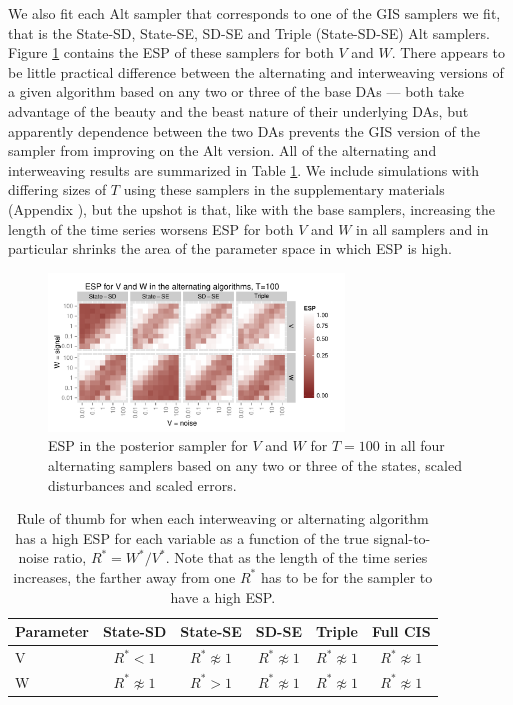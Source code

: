 \documentclass[12pt]{article}
\begin{document}
We also fit each Alt sampler that corresponds to one of the GIS samplers we fit, that is the State-SD, State-SE, SD-SE and Triple (State-SD-SE) Alt samplers. Figure \ref{altESplot} contains the ESP of these samplers for both $V$ and $W$. There appears to be little practical difference between the alternating and interweaving versions of a given algorithm based on any two or three of the base DAs --- both take advantage of the beauty and the beast nature of their underlying DAs, but apparently dependence between the two DAs prevents the GIS version of the sampler from improving on the Alt version. All of the alternating and interweaving results are summarized in Table \ref{tab:stnmix2}. We include simulations with differing sizes of $T$ using these samplers in the supplementary materials (Appendix ), but the upshot is that, like with the base samplers, increasing the length of the time series worsens ESP for both $V$ and $W$ in all samplers and in particular shrinks the area of the parameter space in which ESP is high.

\begin{figure}[!h]
\centering
\includegraphics[width=0.7\textwidth]{altESplot100}
\caption{ESP in the posterior sampler for $V$ and $W$ for $T=100$ in all four alternating samplers based on any two or three of the states, scaled disturbances and scaled errors.}
\label{altESplot}
\end{figure}

\begin{table}
  \centering
  \begin{tabular}{|l|ccccc|}\hline
    Parameter & State-SD        & State-SE       & SD-SE        & Triple            & Full CIS \\\hline
    V         & $R^* < 1$           & $R^* \not\approx 1$ & $R^* \not\approx 1$ & $R^* \not\approx 1$ & $R^* \not\approx 1$ \\
    W         & $R^* \not\approx 1$ & $R^* > 1$           & $R^* \not\approx 1$ & $R^* \not\approx 1$ & $R^* \not\approx 1$\\\hline
  \end{tabular}
  \caption{Rule of thumb for when each interweaving or alternating algorithm has a high ESP for each variable as a function of the true signal-to-noise ratio, $R^*=W^*/V^*$. Note that as the length of the time series increases, the farther away from one $R^*$ has to be for the sampler to have a high ESP.}
  \label{tab:stnmix2}
\end{table}
\end{document}
